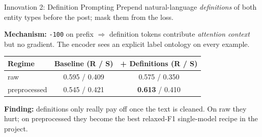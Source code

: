 \documentclass[aspectratio=169,10pt]{beamer}
\begin{document}
\begin{frame}{Innovation 2: Definition Prompting}
  Prepend natural-language \emph{definitions} of both entity types before the post; mask them from the loss.
  \medskip

  \begin{center}\scriptsize
  \end{center}
  \smallskip

  \footnotesize \textbf{Mechanism:} \texttt{-100} on prefix $\Rightarrow$ definition tokens contribute \emph{attention context} but no gradient. The encoder sees an explicit label ontology on every example.

  \begin{center}\footnotesize
  \begin{tabular}{lcc}
    \toprule
    Regime & Baseline (R / S) & + Definitions (R / S) \\
    \midrule
    raw & 0.595 / 0.409 & 0.575 / 0.350 \\
    preprocessed & 0.545 / 0.421 & \textbf{0.613} / 0.410 \\
    \bottomrule
  \end{tabular}
  \end{center}
  \vspace{-0.4em}
  \footnotesize \textbf{Finding:} definitions only really pay off once the text is cleaned. On raw they hurt; on preprocessed they become the best relaxed-F1 single-model recipe in the project.
\end{frame}
\end{document}
